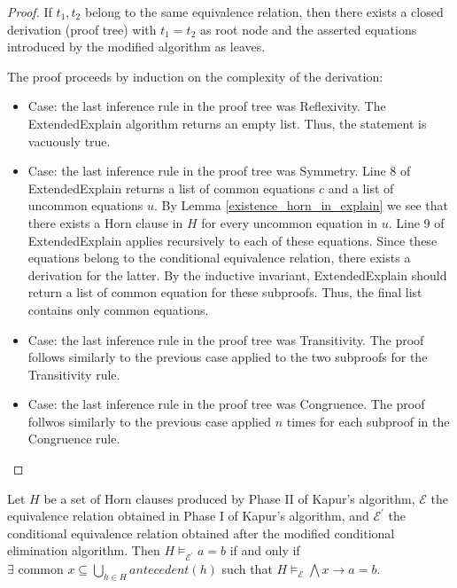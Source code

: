 \begin{proof} 
  If $t_1, t_2$ belong to the same equivalence relation,
  then there exists a closed derivation (proof tree) 
  with $t_1 = t_2$ as root node and the asserted
  equations introduced by the modified algorithm
  as leaves.

  The proof proceeds by induction on the complexity of the 
  derivation:
  
  \begin{itemize}
    \item Case: the last inference rule in the proof 
      tree was Reflexivity. The ExtendedExplain 
      algorithm returns an empty list. Thus, the
      statement is vacuously true.
    \item Case: the last inference rule in the proof 
      tree was Symmetry. Line 8 of ExtendedExplain
      returns a list of common equations $c$ and a list
      of uncommon equations $u$. 
      By Lemma \ref{existence_horn_in_explain}
      we see that there exists a Horn clause in $H$ for
      every uncommon equation in $u$. Line 9 of 
      ExtendedExplain applies recursively to each of 
      these equations. Since these equations belong
      to the conditional equivalence relation, there
      exists a derivation for the latter.
      By the inductive invariant, ExtendedExplain
      should return a list of common equation for 
      these subproofs. Thus, the final list contains
      only common equations.
    \item Case: the last inference rule in the proof 
      tree was Transitivity. The proof follows similarly
      to the previous case applied to the two subproofs
      for the Transitivity rule.
    \item Case: the last inference rule in the proof 
      tree was Congruence. The proof follwos similarly
      to the previous case applied $n$ times for each
      subproof in the Congruence rule.
  \end{itemize}
\end{proof}

\begin{corollary}
  Let $H$ be a set of Horn clauses produced by 
  Phase II of Kapur's algorithm, $\mathcal{E}$ the 
  equivalence relation obtained in Phase I of Kapur's 
  algorithm, and $\mathcal{E^{'}}$ the conditional 
  equivalence relation obtained after the modified
  conditional elimination algorithm. Then
  $H \models_{\mathcal{E^{'}}} a = b$ if and only if
  $\exists \text{ common } x \subseteq 
  \bigcup_{h \in H} antecedent(h)$ such that
$H \models_{\mathcal{E}} \bigwedge x \rightarrow a = b$.
\end{corollary}

